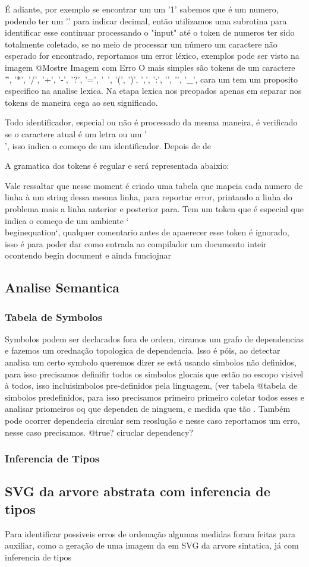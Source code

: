 É  adiante, por exemplo se encontrar um um '1' sabemos que é um numero, podendo ter um '.' para indicar decimal, então utilizamos 
uma subrotina para identificar esse continuar processando o "input" até o token de numeros ter sido totalmente coletado, se no meio de processar um número um caractere não esperado for encontrado, reportamos um error léxico, exemplos pode ser visto na imagem @{Mostre Imagem com Erro}
O mais simples são tokens de um caractere '\^', '*', '/', '+', '-', '?', '=', '~', '(', ')', ',', ':', '{', '}', '\_', cara um tem um proposito especifico na analise lexica. Na etapa lexica nos preopados apenas em separar nos tokens de maneira cega ao seu significado.


Todo identificador, especial ou não é processado da mesma maneira, é verificado se o caractere atual é um letra ou um '\\', isso indica o começo 
de um identificador. Depois de de

A gramatica dos tokens é regular e será representada abaixio:


Vale ressaltar que nesse moment é criado uma tabela que mapeia cada numero de linha à um string dessa mesma linha, para reportar error, printando a linha do problema mais a linha anterior e posterior para.
Tem um token que é especial que indica o começo de um ambiente `\\begin{equation}`, qualquer comentario antes de apaerecer esse token é ignorado, isso é para poder dar como entrada ao compilador um documento inteir ocontendo begin document e ainda funciojnar



\subsection{Analise Semantica}

\subsubsection{Tabela de Symbolos}
Symbolos podem ser declarados fora de ordem, ciramos um grafo de dependencias e fazemos um orednação topologica de dependencia.
Isso é póis, ao detectar analisa um certo symbolo queremos dizer se está usando simbolos não definidos, para isso precisamos definifir todos os simbolos glocais que estão no escopo visivel à todos, isso incluisimbolos pre-definidos pela linguagem, (ver tabela @{tabela de simbolos predefinidos}, para isso precisamos primeiro primeiro coletar todos esses e analisar priomeiros oq que dependen de ninguem, e medida que tão
. Também pode ocorrer dependecia circular sem reoslução e nesse caso reportamos um erro, nesse caso precisamos. @{true? ciruclar dependency?}

\subsubsection{Inferencia de Tipos}

\subsection{SVG da arvore abstrata com inferencia de tipos}
Para identificar possiveis erros de ordenação algumas medidas foram feitas para auxiliar, como a geração de uma imagem da 
em SVG da arvore sintatica, já com inferencia de tipos


